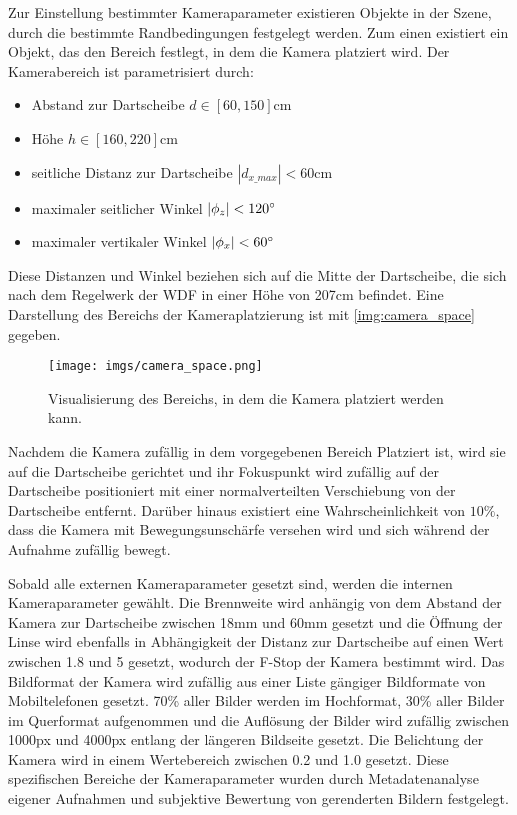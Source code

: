 Zur Einstellung bestimmter Kameraparameter existieren Objekte in der Szene, durch die bestimmte Randbedingungen festgelegt werden. Zum einen existiert ein Objekt, das den Bereich festlegt, in dem die Kamera platziert wird. Der Kamerabereich ist parametrisiert durch:
\begin{itemize}
    \item Abstand zur Dartscheibe $d \in [60, 150]\text{cm}$
    \item Höhe $h \in [160, 220]\text{cm}$
    \item seitliche Distanz zur Dartscheibe $|d_{x\_max}| < 60\text{cm}$
    \item maximaler seitlicher Winkel $|\phi_z| < 120^{\circ}$
    \item maximaler vertikaler Winkel $|\phi_x| < 60^{\circ}$
\end{itemize}

Diese Distanzen und Winkel beziehen sich auf die Mitte der Dartscheibe, die sich nach dem Regelwerk der \ac{WDF} in einer Höhe von 207cm befindet. Eine Darstellung des Bereichs der Kameraplatzierung ist mit \autoref{img:camera_space} gegeben.

\begin{figure}
    \centering
    \texttt{[image: imgs/camera\_space.png]}
    \caption{Visualisierung des Bereichs, in dem die Kamera platziert werden kann.}
    \label{img:camera_space}
\end{figure}

Nachdem die Kamera zufällig in dem vorgegebenen Bereich Platziert ist, wird sie auf die Dartscheibe gerichtet und ihr Fokuspunkt wird zufällig auf der Dartscheibe positioniert mit einer normalverteilten Verschiebung von der Dartscheibe entfernt. Darüber hinaus existiert eine Wahrscheinlichkeit von $10\%$, dass die Kamera mit Bewegungsunschärfe versehen wird und sich während der Aufnahme zufällig bewegt.

Sobald alle externen Kameraparameter gesetzt sind, werden die internen Kameraparameter gewählt. Die Brennweite wird anhängig von dem Abstand der Kamera zur Dartscheibe zwischen 18mm und 60mm gesetzt und die Öffnung der Linse wird ebenfalls in Abhängigkeit der Distanz zur Dartscheibe auf einen Wert zwischen 1.8 und 5 gesetzt, wodurch der F-Stop der Kamera bestimmt wird. Das Bildformat der Kamera wird zufällig aus einer Liste gängiger Bildformate von Mobiltelefonen gesetzt. 70\% aller Bilder werden im Hochformat, 30\% aller Bilder im Querformat aufgenommen und die Auflösung der Bilder wird zufällig zwischen 1000px und 4000px entlang der längeren Bildseite gesetzt. Die Belichtung der Kamera wird in einem Wertebereich zwischen 0.2 und 1.0 gesetzt. Diese spezifischen Bereiche der Kameraparameter wurden durch Metadatenanalyse eigener Aufnahmen und subjektive Bewertung von gerenderten Bildern festgelegt.


